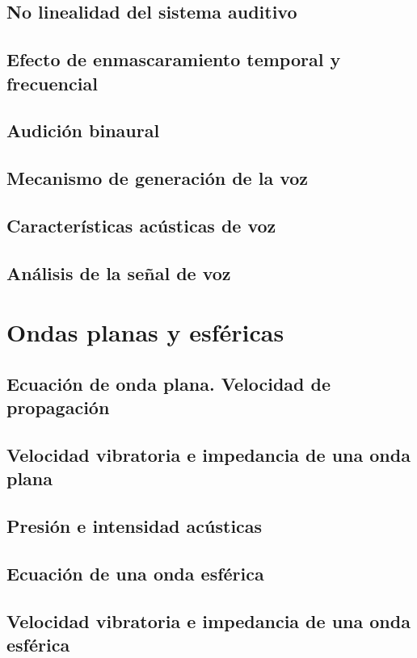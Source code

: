 \documentclass[a4paper]{book}
\begin{document}
\section{No linealidad del sistema auditivo}
\section{Efecto de enmascaramiento temporal y frecuencial}
\section{Audición binaural}
\section{Mecanismo de generación de la voz}
\section{Características acústicas de voz}
\section{Análisis de la señal de voz}

\chapter{Ondas planas y esféricas}
\section{Ecuación de onda plana. Velocidad de propagación}
\section{Velocidad vibratoria e impedancia de una onda plana}
\section{Presión e intensidad acústicas}
\section{Ecuación de una onda esférica}
\section[Velocidad vibratoria e impedancia de una onda esférica]{Velocidad vibratoria e impedancia de una onda\\ esférica}
\end{document}
